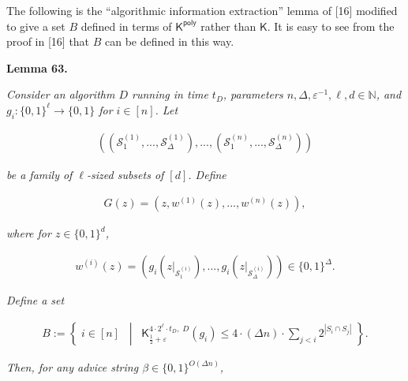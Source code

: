 


The following is the “algorithmic information extraction” lemma of [16] modified to give a set $B$ defined in terms of ${\mathsf{K}}^{{\mathsf{poly}}}$ rather than ${\mathsf{K}}$. It is easy to see from the proof in [16] that $B$ can be defined in this way.\par





\par\medskip\noindent\textbf{
\textbf{Lemma 63}\textbf{.}
}\par



\emph{Consider an algorithm $D$ running in time $t_{D}$, parameters $n,\Delta,\varepsilon^{-1},\ell,d\in\mathbb{N}$, and $g_{i}:\{0,1\}^{\ell}\to\{0,1\}$ for $i\in[n]$. Let}\par


\[\begin{gathered}
\left(\left(\mathcal{S}^{(1)}_{1},...,\mathcal{S}^{(1)}_{\Delta}\right),...,\left(\mathcal{S}^{(n)}_{1},...,\mathcal{S}^{(n)}_{\Delta}\right)\right)
\end{gathered}\]


\emph{be a family of $\ell$-sized subsets of $[d]$. Define}\par


\[\begin{gathered}
G(z)=\left(z,w^{(1)}(z),...,w^{(n)}(z)\right),
\end{gathered}\]


\emph{where for $z\in\{0,1\}^{d}$,}\par


\[\begin{gathered}
w^{(i)}(z)=\left(g_{i}\left(z|_{\mathcal{S}^{(i)}_{1}}\right),...,g_{i}\left(z|_{\mathcal{S}^{(i)}_{\Delta}}\right)\right)\in\{0,1\}^{\Delta}.
\end{gathered}\]


\emph{Define a set}\par


\[\begin{gathered}
B:=\left\{\;i\in[n]\;\;\middle|\;\;{\mathsf{K}}^{4\cdot 2^{\ell}\cdot t_{D},\;D}_{\frac{1}{2}+\varepsilon}(g_{i})\leq 4\cdot(\Delta n)\cdot\sum_{j<i}2^{|S_{i}\cap S_{j}|}\;\right\}.
\end{gathered}\]


\emph{Then, for any advice string $\beta\in\{0,1\}^{O(\Delta n)}$,}\par


